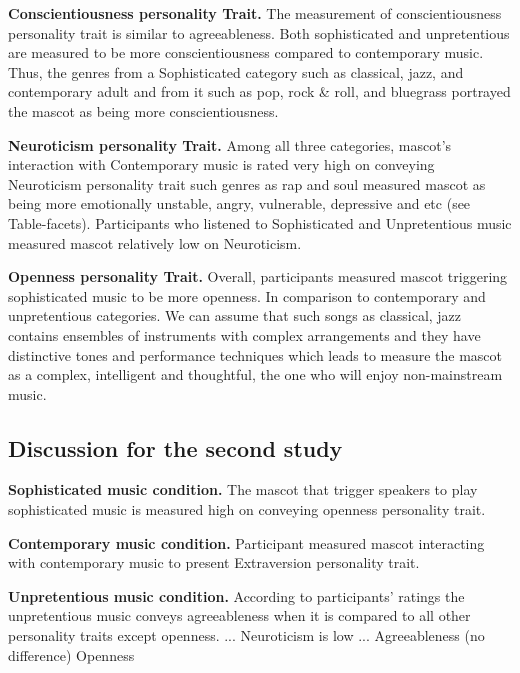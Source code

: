 \par\textbf{Conscientiousness personality Trait.}
The measurement of conscientiousness personality trait is similar to agreeableness.
Both sophisticated and unpretentious are measured to be more conscientiousness compared to contemporary music.
Thus, the genres from a Sophisticated category such as classical, jazz, and contemporary adult and from it such as
pop, rock \& roll, and bluegrass portrayed the mascot as being more conscientiousness.

\par\textbf{Neuroticism personality Trait.}
Among all three categories, mascot's interaction with Contemporary music is rated very high on
conveying Neuroticism personality trait such genres as rap and soul measured mascot as being more
emotionally unstable, angry, vulnerable, depressive and etc (see Table-facets).
Participants who listened to Sophisticated and Unpretentious music measured mascot relatively low on Neuroticism.

\par\textbf{Openness personality Trait.}
Overall, participants measured mascot triggering sophisticated music to be more openness.
In comparison to contemporary and unpretentious categories.
We can assume that such songs as classical, jazz contains ensembles of instruments with complex
arrangements and they have distinctive tones and performance techniques which leads to measure the
mascot as a complex, intelligent and thoughtful, the one who will enjoy non-mainstream music.

\subsection{Discussion for the second study}
\label{subsec:discussion-for-the-second-study2}

\par\textbf{Sophisticated music condition.}
The mascot that trigger speakers to play sophisticated music is measured high on conveying openness personality trait.

\par\textbf{Contemporary music condition.}
Participant measured mascot interacting with contemporary music to present Extraversion personality trait.

\par\textbf{Unpretentious music condition.}
According to participants' ratings the unpretentious music conveys agreeableness when it is compared
to all other personality traits except openness.
... Neuroticism is low
... Agreeableness (no difference) Openness

